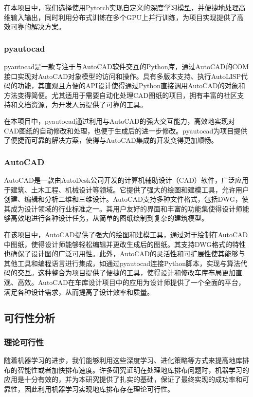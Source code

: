 在本项目中，我们选择使用Pytorch实现自定义的深度学习模型，并便捷地处理高维输入输出，同时利用分布式训练在多个GPU上并行训练，为项目实现提供了高效可靠的解决方案。
\subsubsection{pyautocad}
pyautocad\cite{shahzad2023implementing}是一款专注于与AutoCAD软件交互的Python库，通过AutoCAD的COM接口实现对AutoCAD对象模型的访问和操作。具有多版本支持、执行AutoLISP代码的功能，其直观且方便的API设计使得通过Python直接调用AutoCAD的对象和方法变得简便。尤其适用于需要自动化处理CAD图纸的项目，拥有丰富的社区支持和文档资源，为开发人员提供了可靠的工具。

在本项目中，pyautocad通过利用与AutoCAD的强大交互能力，高效地实现对CAD图纸的自动修改和处理，也便于生成后的进一步修改。pyautocad为项目提供了便捷而可靠的解决方案，使得与AutoCAD集成的开发变得更加顺畅。
\subsubsection{AutoCAD}
AutoCAD是一款由AutoDesk公司开发的计算机辅助设计（CAD）软件，广泛应用于建筑、土木工程、机械设计等领域。它提供了强大的绘图和建模工具，允许用户创建、编辑和分析二维和三维设计。AutoCAD支持多种文件格式，包括DWG，使其成为设计领域的行业标准之一。其用户友好的界面和丰富的功能集使得设计师能够高效地进行各种设计任务，从简单的图纸绘制到复杂的建筑模型。

在该项目中，AutoCAD提供了强大的绘图和建模工具，通过对于绘制在AutoCAD中图纸，使得设计师能够轻松编辑并更改生成后的图纸。其支持DWG格式的特性也确保了设计图的广泛可用性。此外，AutoCAD的灵活性和可扩展性使其能够与其他工具和编程语言进行集成，如通过pyautocad连接Python脚本，实现与算法代码的交互。这种整合为项目提供了便捷的工具，使得设计和修改车库布局更加直观、高效。AutoCAD在车库设计项目中的应用为设计师提供了一个全面的平台，满足各种设计需求，从而提高了设计效率和质量。
\subsection{可行性分析}
\subsubsection{理论可行性}
随着机器学习的进步，我们能够利用这些深度学习、进化策略\cite{1020332216.nh}等方式来提高地库排布的智能性或者加快排布速度。许多研究证明在处理地库排布问题时，机器学习的应用是十分有效的，并为本研究提供了扎实的基础，保证了最终实现的成功率和可靠性，因此利用机器学习实现地库排布存在理论可行性。
